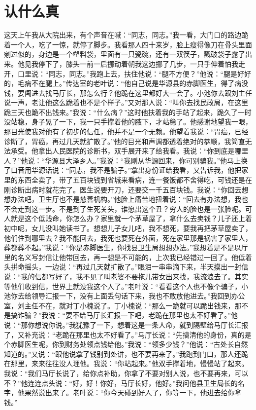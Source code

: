 \documentclass[12pt,oneside]{book}
\begin{document}
\chapter{认什么真}
这天上午我从大院出来，有个声音在喊：``同志，同志。''我一看，大门口的路边跪着一个人，吃了一惊，就停了脚步。我看那人四十来岁，脸上瘦得像刀在骨头里面剜过似的，身边是一个塑料袋，里面有一只瓷碗，还有一双筷子，戳破袋子露了出来。他见我停下了，膝头一前一后挪动着朝我这边挪了几步，一只手伸着怕我走开，口里说：``同志，同志。''我跑上去，扶住他说：``腿不方便？''他说：``腿是好好的，毛病不在腿上。''传达室的老叶说：``他自己说是华源县的赤脚医生，得了病没钱，要闯进去找马厅长，那怎么行？他跪在这里都好大一会了。小池你去跟刘主任说一声，老让他这么跪着也不是个样子。''又对那人说：``叫你去找民政局，在这里跪三天也跪不出钱来。''我说：``什么病？''这时他扶着我的手站了起来，跪久了一时没站稳，身子晃了一下，我一只手撑着他的腋下，才站稳了。他感谢地望我一眼，那目光使我对他有了初步的信任，他并不是一个无赖。他望着我说：``胃癌，已经诊断了，胃癌，再过几天就扩散了。''他的目光和声调都透着绝对的恭顺，我简直无法承受。他拿出人民医院的诊断书，双手展开来了给我看。我说：``你到底是哪里人？''他说：``华源县大泽乡人。''我说：``我刚从华源回来，你可别骗我。''他马上换了口音用华源话说：``同志，我不是骗子。''拿出身份证给我看，又告诉我，他把家里的东西全卖了，带了五百块钱到省城来看病，连一餐饭都不舍得吃，可钱还是在刚诊断出病时就花完了。医生说要开刀，还要交一千五百块钱。我说：``你回去想想办法吧，卫生厅也不是慈善机构。''他脸上痛苦地扭着说：``回去有办法想，我也不会走到这一步。不是到了生死关头，谁愿出这个丑？穷人的脸也是一张脸呢。可人就是这个低贱命，你怎么办？家里就一个茅草屋了，拿什么去卖钱？儿子还上着初中呢，女儿没叫她读书了。想想儿子女儿吧，我不想死，要我再把茅草屋卖了，他们住到哪里去？我不能回去，我死也要死在外面，死在家里那是祸害了家里人，葬都葬不起。''我说：``你是赤脚医生，你找县卫生局想想办法。''我想着是不是以厅里的名义写封信让他带回去，再一想是不可能的，上次我已经错过一回了。他低着头拼命摇头，一边说：``再过几天就扩散了。''眼泪一串串滴下来，半天摸出一封信说：``我的信都写好了，我不见了叫老婆不要拖儿带女出来找，我流浪去了。其实等他们收到信，世界上就没我这个人了。''老叶说：``看看这个人也不像个骗子，小池你去给领导汇报一下，没有上面丢句话下来，我也不敢放他进去。''我回到办公室，刘主任不在，就对丁小槐说了。丁小槐说：``那么一跪就可以跪出钱来，那不是搞诈骗？''我说：``要不给马厅长汇报一下吧，老跪在那里也太不好看了。''他说：``那你想说你说。''我犹豫了一下，想着这是一条人命，就到隔壁给马厅长汇报了，又补充说：``老跪在那里也太不好看了。''马厅长说：``先搞清他的身份，真的是个赤脚医生呢，你到财务处领点钱给他。''我说：``领多少钱？''他说：``古处长自然知道的。''又说：``跟他说拿了钱别到处讲，也不要再来了。''我跑到门口，那人还跪在那里，来来往往没人理他。我说：``你站起来。''他双手撑着地，慢慢站了起来。我说：``我们马厅长说了，给你点补助，你拿了不要对别人说，也不要再来，可以不？''他连连点头说：``好，好！你好，马厅长好，他好。''我问他县卫生局长的名字，他果然说出来了。老叶说：``你今天碰到好人了，你等一下，他进去给你拿钱。''
\end{document}
